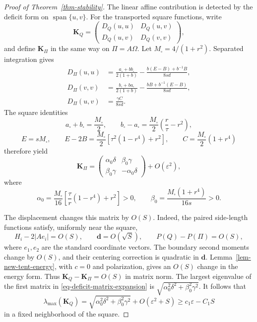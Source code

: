 \documentclass[11pt]{amsart}
\theoremstyle{remark}\newtheorem{remark}[theorem]{Remark}
\numberwithin{equation}{section}
\begin{document}
\begin{proof}[Proof of Theorem~\ref{thm-stability}]
The linear affine contribution is detected by the deficit form on
$\operatorname{span}\{u,v\}$. For the transported square functions, write
\[
\mathbf K_Q=
\begin{pmatrix}
D_Q(u,u)&D_Q(u,v)\\
D_Q(u,v)&D_Q(v,v)
\end{pmatrix},
\]
and define $\mathbf K_\Pi$ in the same way on $\Pi=A\Omega$.
Let $M_\square=4/(1+r^2)$. Separated integration gives
\[
\begin{split}
D_\Pi(u,u)&=\frac{a_\square+bb_\square}{2(1+b)}
-\frac{b(E-B)+b^{-1}B}{8sd},\\
D_\Pi(v,v)&=\frac{b_\square+ba_\square}{2(1+b)}
-\frac{bB+b^{-1}(E-B)}{8sd},\\
D_\Pi(u,v)&=\frac{\gamma C}{8sd}.
\end{split}
\]
The square identities
\[
a_\square+b_\square=\frac{M_\square}{2},\qquad
b_\square-a_\square=
\frac{M_\square}{2}\left(\frac r\tau-r^2\right),
\]
\[
E=sM_\square,\qquad
E-2B=\frac{M_\square}{2}
\left[\tau^2(1-r^4)+r^2\right],\qquad
C=\frac{M_\square}{2}(1+r^4)
\]
therefore yield
\begin{equation}\label{eq-deficit-matrix-expansion}
\mathbf K_\Pi=
\begin{pmatrix}
\alpha_0\delta&\beta_0\gamma\\
\beta_0\gamma&-\alpha_0\delta
\end{pmatrix}+O(\varepsilon^2),
\end{equation}
where
\[
\alpha_0=\frac{M_\square}{16}
\left[\frac\tau r(1-r^4)+r^2\right]>0,\qquad
\beta_0=\frac{M_\square(1+r^4)}{16s}>0.
\]

The displacement changes this matrix by $O(S)$. Indeed, the paired
side-length functions satisfy, uniformly near the square,
\[
H_i-2|Ae_i|=O(S),\qquad \mathbf d=O(\sqrt S),\qquad
P(Q)-P(\Pi)=O(S),
\]
where $e_1,e_2$ are the standard coordinate vectors.
The boundary second moments change by $O(S)$, and their centering
correction is quadratic in $\mathbf d$. Lemma~\ref{lem-new-tent-energy},
with $c=0$ and polarization, gives an $O(S)$ change in the energy form.
Thus $\mathbf K_Q-\mathbf K_\Pi=O(S)$ in matrix norm.
The largest eigenvalue of the first matrix in
\eqref{eq-deficit-matrix-expansion} is
$\sqrt{\alpha_0^2\delta^2+\beta_0^2\gamma^2}$. It follows that
\[
\lambda_{\max}(\mathbf K_Q)
=\sqrt{\alpha_0^2\delta^2+\beta_0^2\gamma^2}
+O(\varepsilon^2+S)
\ge c_1\varepsilon-C_1S
\]
in a fixed neighborhood of the square.


\end{proof}
\end{document}
